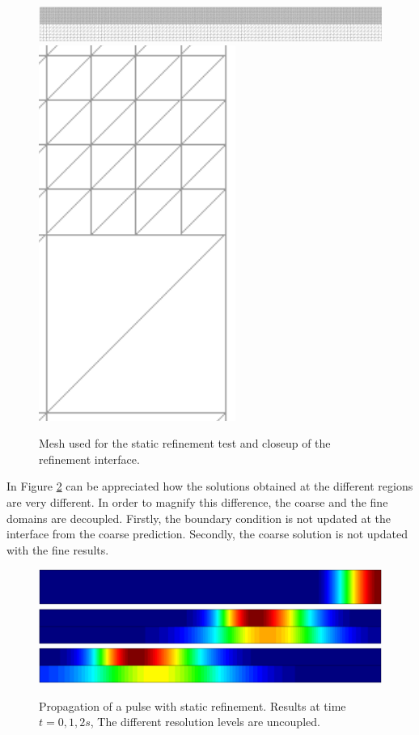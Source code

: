 \begin{figure} [htb]
    \centering
    \includegraphics[width=.92\textwidth]{img/multigrid/static/mesh}
    \hfill
    \includegraphics[width=.05\textwidth]{img/multigrid/static/mesh_detail_2}
    \caption{Mesh used for the static refinement test and closeup of the refinement interface.}
    \label{multilevel_static_mesh}
\end{figure}


In Figure \ref{multilevel_static_decoupled} can be appreciated how the solutions obtained at the different regions are very different. In order to magnify this difference, the coarse and the fine domains are decoupled. Firstly, the boundary condition is not updated at the interface from the coarse prediction. Secondly, the coarse solution is not updated with the fine results.


\begin{figure} [htb]
    \centering
    \includegraphics[width=\textwidth]{img/multigrid/static/decoupled-0}\\
    \vspace{5pt}
    \includegraphics[width=\textwidth]{img/multigrid/static/decoupled-1}\\
    \vspace{5pt}
    \includegraphics[width=\textwidth]{img/multigrid/static/decoupled-2}
    \caption{Propagation of a pulse with static refinement. Results at time $t=0,1,2s$, The different resolution levels are uncoupled.}
    \label{multilevel_static_decoupled}
\end{figure}


